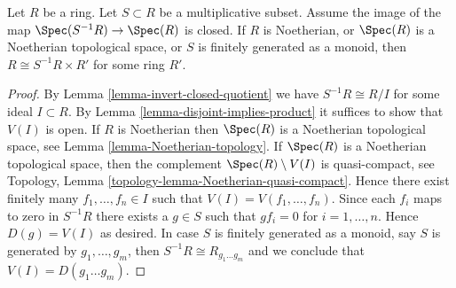 \begin{lemma}
\label{lemma-invert-closed-split}
Let $R$ be a ring. Let $S \subset R$ be a multiplicative subset.
Assume the image of the map $\Spec(S^{-1}R) \to \Spec(R)$
is closed. If $R$ is Noetherian, or $\Spec(R)$ is a
Noetherian topological space, or $S$ is finitely generated as a monoid,
then $R \cong S^{-1}R \times R'$ for some ring $R'$.
\end{lemma}

\begin{proof}
By Lemma \ref{lemma-invert-closed-quotient} we have $S^{-1}R \cong R/I$
for some ideal $I \subset R$. By Lemma \ref{lemma-disjoint-implies-product}
it suffices to show that $V(I)$ is open.
If $R$ is Noetherian then $\Spec(R)$ is a Noetherian
topological space, see Lemma \ref{lemma-Noetherian-topology}.
If $\Spec(R)$ is a Noetherian topological space,
then the complement $\Spec(R) \setminus V(I)$ is quasi-compact, see
Topology, Lemma \ref{topology-lemma-Noetherian-quasi-compact}.
Hence there exist finitely many $f_1, \ldots, f_n \in I$ such
that $V(I) = V(f_1, \ldots, f_n)$.
Since each $f_i$ maps to zero in $S^{-1}R$
there exists a $g \in S$ such that $gf_i = 0$ for
$i = 1, \ldots, n$. Hence $D(g) = V(I)$ as desired.
In case $S$ is finitely generated as a monoid, say $S$ is generated
by $g_1, \ldots, g_m$, then $S^{-1}R \cong R_{g_1 \ldots g_m}$
and we conclude that $V(I) = D(g_1 \ldots g_m)$.
\end{proof}